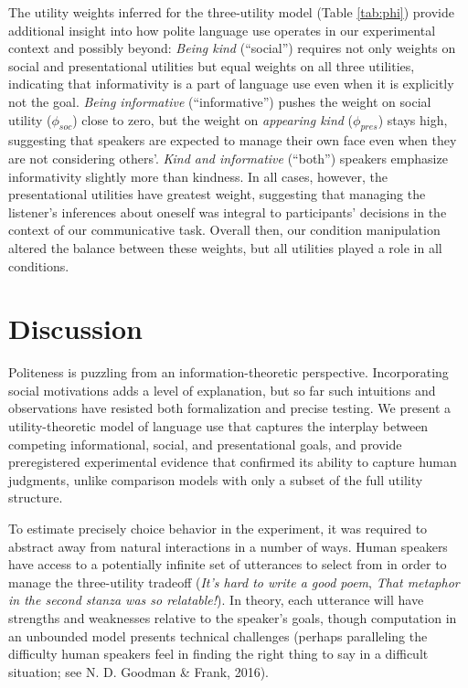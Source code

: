 \documentclass[oneside]{report}
\begin{document}
The utility weights inferred for the three-utility model (Table
\ref{tab:phi}) provide additional insight into how polite language use
operates in our experimental context and possibly beyond: \emph{Being
kind} (``social'') requires not only weights on social and
presentational utilities but equal weights on all three utilities,
indicating that informativity is a part of language use even when it is
explicitly not the goal. \emph{Being informative} (``informative'')
pushes the weight on social utility (\(\phi_{soc}\)) close to zero, but
the weight on \emph{appearing kind} (\(\phi_{pres}\)) stays high,
suggesting that speakers are expected to manage their own face even when
they are not considering others'. \emph{Kind and informative} (``both'')
speakers emphasize informativity slightly more than kindness. In all
cases, however, the presentational utilities have greatest weight,
suggesting that managing the listener's inferences about oneself was
integral to participants' decisions in the context of our communicative
task. Overall then, our condition manipulation altered the balance
between these weights, but all utilities played a role in all
conditions.

\section{Discussion}\label{discussion}

Politeness is puzzling from an information-theoretic perspective.
Incorporating social motivations adds a level of explanation, but so far
such intuitions and observations have resisted both formalization and
precise testing. We present a utility-theoretic model of language use
that captures the interplay between competing informational, social, and
presentational goals, and provide preregistered experimental evidence
that confirmed its ability to capture human judgments, unlike comparison
models with only a subset of the full utility structure.

To estimate precisely choice behavior in the experiment, it was required
to abstract away from natural interactions in a number of ways. Human
speakers have access to a potentially infinite set of utterances to
select from in order to manage the three-utility tradeoff (\emph{It's
hard to write a good poem}, \emph{That metaphor in the second stanza was
so relatable!}). In theory, each utterance will have strengths and
weaknesses relative to the speaker's goals, though computation in an
unbounded model presents technical challenges (perhaps paralleling the
difficulty human speakers feel in finding the right thing to say in a
difficult situation; see N. D. Goodman \& Frank, 2016).
\end{document}
